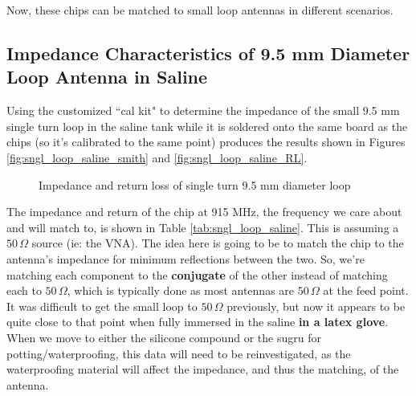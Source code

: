 \documentclass[12pt,onecolumn,titlepage]{article}
\begin{document}
Now, these chips can be matched to small loop antennas in different scenarios.

\subsection{Impedance Characteristics of 9.5 mm Diameter Loop Antenna in Saline}
\indent \indent Using the customized ``cal kit" to determine the impedance of the small 9.5 mm single turn loop in the saline tank while it is soldered onto the same board as the chips (so it's calibrated to the same point) produces the results shown in Figures \ref{fig:sngl_loop_saline_smith} and \ref{fig:sngl_loop_saline_RL}.

\begin{figure}[htbp]
	\centering
		\quad
	\label{fig:sngl_loop_saline}
	\caption{Impedance and return loss of single turn 9.5 mm diameter loop}
\end{figure}

The impedance and return of the chip at 915 MHz, the frequency we care about and will match to, is shown in Table \ref{tab:sngl_loop_saline}. This is assuming a $50 \, \Omega$ source (ie: the VNA). The idea here is going to be to match the chip to the antenna's impedance for minimum reflections between the two. So, we're matching each component to the {\bf{conjugate}} of the other instead of matching each to $50 \, \Omega$, which is typically done as most antennas are $50 \, \Omega$ at the feed point. It was difficult to get the small loop to $50 \, \Omega$ previously, but now it appears to be quite close to that point when fully immersed in the saline {\bf{in a latex glove}}. When we move to either the silicone compound or the sugru for potting/waterproofing, this data will need to be reinvestigated, as the waterproofing material will affect the impedance, and thus the matching, of the antenna.
\end{document}
